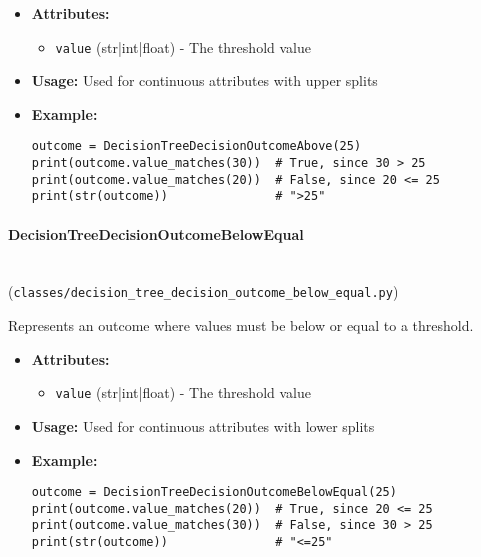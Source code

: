 \documentclass[
english,
smallborders
]{i6prcsht}
\begin{document}
\begin{itemize}
	\item \textbf{Attributes:}
	      \begin{itemize}
		      \item \texttt{value} (str|int|float) - The threshold value
	      \end{itemize}
	\item \textbf{Usage:} Used for continuous attributes with upper splits
	\item \textbf{Example:}
	      \begin{lstlisting}
outcome = DecisionTreeDecisionOutcomeAbove(25)
print(outcome.value_matches(30))  # True, since 30 > 25
print(outcome.value_matches(20))  # False, since 20 <= 25
print(str(outcome))               # ">25"
    \end{lstlisting}
\end{itemize}

\vspace*{0.3cm}

\paragraph{DecisionTreeDecisionOutcomeBelowEqual} \hfill \\ (\texttt{classes/decision\_tree\_decision\_outcome\_below\_equal.py})

Represents an outcome where values must be below or equal to a threshold.

\begin{itemize}
	\item \textbf{Attributes:}
	      \begin{itemize}
		      \item \texttt{value} (str|int|float) - The threshold value
	      \end{itemize}
	\item \textbf{Usage:} Used for continuous attributes with lower splits
	\item \textbf{Example:}
	      \begin{lstlisting}
outcome = DecisionTreeDecisionOutcomeBelowEqual(25)
print(outcome.value_matches(20))  # True, since 20 <= 25
print(outcome.value_matches(30))  # False, since 30 > 25
print(str(outcome))               # "<=25"
    \end{lstlisting}
\end{itemize}

\vspace*{0.3cm}
\end{document}
